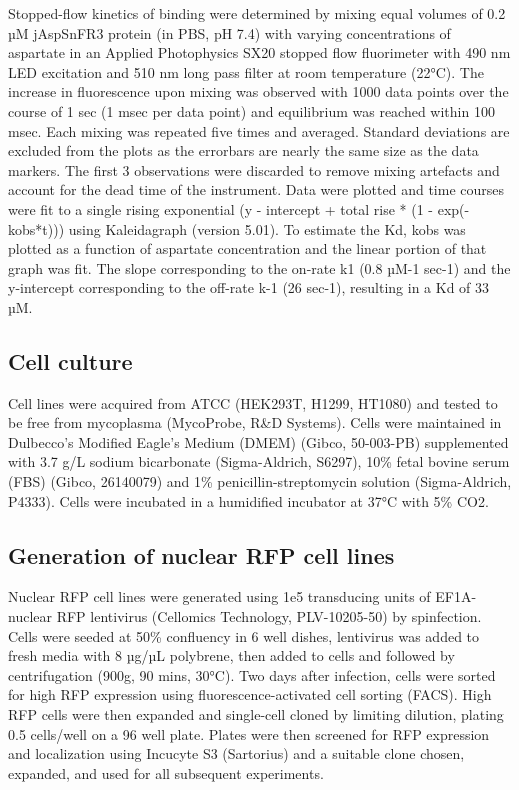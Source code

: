 \documentclass[9pt,lineno]{elife}
\begin{document}
Stopped-flow kinetics of binding were determined by mixing equal volumes of 0.2 µM jAspSnFR3 protein (in PBS, pH 7.4) with varying concentrations of aspartate in an Applied Photophysics SX20 stopped flow fluorimeter with 490 nm LED excitation and 510 nm long pass filter at room temperature (22°C).
The increase in fluorescence upon mixing was observed with 1000 data points over the course of 1 sec (1 msec per data point) and equilibrium was reached within 100 msec.
Each mixing was repeated five times and averaged.
Standard deviations are excluded from the plots as the errorbars are nearly the same size as the data markers.
The first 3 observations were discarded to remove mixing artefacts and account for the dead time of the instrument.
Data were plotted and time courses were fit to a single rising exponential (y - intercept + total rise * (1 - exp(-kobs*t))) using Kaleidagraph (version 5.01).
To estimate the Kd, kobs was plotted as a function of aspartate concentration and the linear portion of that graph was fit.
The slope corresponding to the on-rate k1 (0.8 µM-1 sec-1) and the y-intercept corresponding to the off-rate k-1 (26 sec-1), resulting in a Kd of 33 µM.


\subsection{Cell culture}
Cell lines were acquired from ATCC (HEK293T, H1299, HT1080) and tested to be free from mycoplasma (MycoProbe, R\&D Systems).
Cells were maintained in Dulbecco’s Modified Eagle’s Medium (DMEM) (Gibco, 50-003-PB) supplemented with 3.7 g/L sodium bicarbonate (Sigma-Aldrich, S6297), 10\% fetal bovine serum (FBS) (Gibco, 26140079) and 1\% penicillin-streptomycin solution (Sigma-Aldrich, P4333).
Cells were incubated in a humidified incubator at 37°C with 5\% CO2.

\subsection{Generation of nuclear RFP cell lines}
Nuclear RFP cell lines were generated using 1e5 transducing units of EF1A-nuclear RFP lentivirus (Cellomics Technology, PLV-10205-50) by spinfection.
Cells were seeded at 50\% confluency in 6 well dishes, lentivirus was added to fresh media with 8 µg/µL polybrene, then added to cells and followed by centrifugation (900g, 90 mins, 30°C).
Two days after infection, cells were sorted for high RFP expression using fluorescence-activated cell sorting (FACS).
High RFP cells were then expanded and single-cell cloned by limiting dilution, plating 0.5 cells/well on a 96 well plate.
Plates were then screened for RFP expression and localization using Incucyte S3 (Sartorius) and a suitable clone chosen, expanded, and used for all subsequent experiments.
\end{document}
